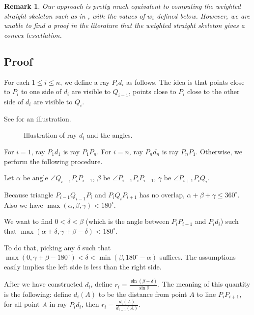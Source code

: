 \documentclass{article}
\let\Cref\crtCref
\theoremstyle{plain}
\newtheorem{remark}        {Remark}     [section]
\begin{document}
\begin{remark}
	\label{remark_weighted_straight_skeleton}
Our approach is pretty much equivalent to computing the weighted straight skeleton
such as in \cite{Eder2018, Eppstein1998}, with the values of $w_i$ defined below.
However, we are unable to find a proof in the literature
that the weighted straight skeleton gives a convex tessellation.
\end{remark}

\subsection{Proof}

For each $1 \leq i \leq n$, we define a ray $P_i d_i$ as follows.
The idea is that points close to $P_i$ to one side of $d_i$ are visible to $Q_{i-1}$,
points close to $P_i$ close to the other side of $d_i$ are visible to $Q_i$.

See \Cref{fig:splitting_ray} for an illustration.

\begin{figure}
    \centering
    
    \caption{Illustration of ray $d_i$ and the angles.}
    \label{fig:splitting_ray}
\end{figure}

For $i = 1$, ray $P_1 d_1$ is ray $P_1 P_n$.
For $i = n$, ray $P_n d_n$ is ray $P_n P_1$.
Otherwise, we perform the following procedure.

Let $\alpha$ be angle $\angle Q_{i-1} P_i P_{i-1}$,
$\beta$ be $\angle P_{i-1} P_i P_{i-1}$,
$\gamma$ be $\angle P_{i+1} P_i Q_i$.

Because triangle $P_{i-1} Q_{i-1} P_i$ and
$P_i Q_i P_{i+1}$ has no overlap,
$\alpha+\beta+\gamma \leq 360^\circ$.
Also we have $\max(\alpha, \beta, \gamma)<180^\circ$.

We want to find $0<\delta<\beta$ (which is the angle between $P_i P_{i-1}$ and $P_i d_i$)
such that $\max(\alpha + \delta, \gamma+\beta-\delta) < 180^\circ$.

To do that, picking any $\delta$ such that $\max(0, \gamma+\beta-180^\circ) < \delta < \min(\beta, 180^\circ-\alpha)$ suffices.
The assumptions easily implies the left side is less than the right side.

After we have constructed $d_i$, define $r_i = \frac{\sin(\beta-\delta)}{\sin \delta}$.
The meaning of this quantity is the following:
define $d_i(A)$ to be the distance from point $A$ to line $P_i P_{i+1}$,
for all point $A$ in ray $P_i d_i$,
then $r_i = \frac{d_i(A)}{d_{i-1}(A)}$.
\end{document}
